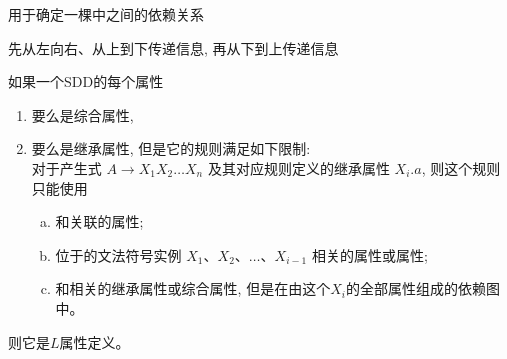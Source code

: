 \begin{frame}{}
  \begin{center}
    用于确定一棵中之间的依赖关系

    \vspace{0.50cm}


    \vspace{0.50cm}
     先从左向右、从上到下传递信息, 再从下到上传递信息
  \end{center}
\end{frame}

\begin{frame}{}
  \begin{center}
    \begin{definition}
      如果一个SDD的每个属性
      \begin{enumerate}[(1)]
        \setlength{\itemsep}{8pt}
        \item 要么是综合属性,
        \item 要么是继承属性, 但是它的规则满足如下限制: \\
          对于产生式 $A \to X_{1}X_{2} \dots X_{n}$ 及其对应规则定义的继承属性 $X_{i}.a$,
          则这个规则只能使用
          \begin{enumerate}[(a)]
            \setlength{\itemsep}{6pt}
            \item 和关联的属性;
            \item 位于的文法符号实例 $X_{1}$、$X_{2}$、$\dots$、$X_{i-1}$
              相关的属性或属性;
            \item 和相关的继承属性或综合属性,
              但是在由这个$X_{i}$的全部属性组成的依赖图中。
          \end{enumerate}
      \end{enumerate}
      则它是$L$属性定义。
    \end{definition}
  \end{center}
\end{frame}

